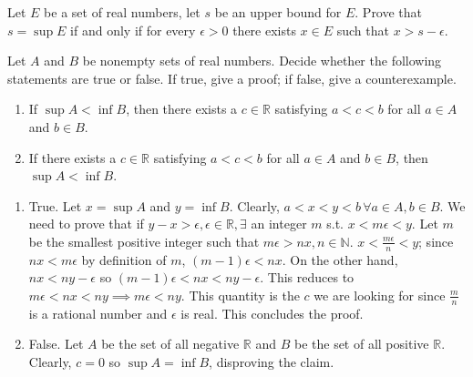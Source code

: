 \documentclass[12pt,letterpaper,boxed]{hmcpset}
\begin{document}
\begin{problem}[Exercise 4.9.]
Let $E$ be a set of real numbers, let $s$ be an upper bound for $E$. Prove that $s = \sup E$ if and only if for every $\epsilon > 0$ there exists $x \in E$ such that $x > s - \epsilon.$
\end{problem}

\begin{solution}
\end{solution}

\begin{problem}[Exercise 4.10.]
Let $A$ and $B$ be nonempty sets of real numbers. Decide whether the following statements are true or false. If true, give a proof; if false, give a counterexample.
\begin{enumerate}
	\itemsep0em
	\item If $\sup A < \inf B$, then there exists a $c \in \mathbb{R}$ satisfying $a < c < b$ for all $a \in A$ and $b \in B$.
	\item If there exists a $c\in \mathbb{R}$ satisfying $a < c < b$ for all $a \in A$ and $b \in B$, then $\sup A < \inf B$.
\end{enumerate}
\end{problem}

\begin{solution}

\begin{enumerate}
	\itemsep0em
	\item True. Let $x=\sup A$ and $y=\inf B$. Clearly, $a < x < y < b \, \forall a \in A, b \in B.$ We need to prove that if $y - x > \epsilon, \epsilon \in \mathbb{R}, \exists$ an integer $m$ s.t. $x < m\epsilon < y.$ Let $m$ be the smallest positive integer such that $m\epsilon > nx, n\in\mathbb{N}.$ $x < \frac{m\epsilon}{n} < y$; since $nx<m\epsilon$ by definition of $m$, $(m - 1)\epsilon < nx.$ On the other hand, $nx < ny - \epsilon$ so $(m-1)\epsilon < nx < ny - \epsilon.$ This reduces to $m\epsilon < nx < ny \implies m\epsilon < ny.$ This quantity is the $c$ we are looking for since $\frac{m}{n}$ is a rational number and $\epsilon$ is real. This concludes the proof.
	\item False. Let $A$ be the set of all negative $\mathbb{R}$ and $B$ be the set of all positive $\mathbb{R}$. Clearly, $c = 0$ so $\sup A = \inf B$, disproving the claim.
\end{enumerate}

\end{solution}
\end{document}
